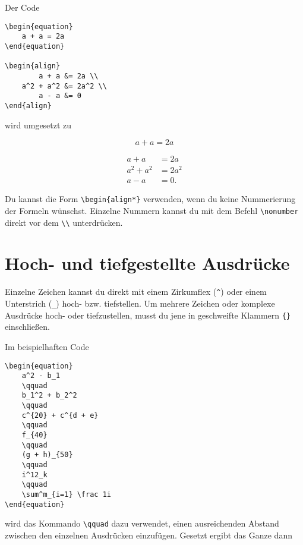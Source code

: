 Der Code

\begin{lstlisting}
\begin{equation}
	a + a = 2a
\end{equation}

\begin{align}
	    a + a &= 2a \\
	a^2 + a^2 &= 2a^2 \\
	    a - a &= 0
\end{align}
\end{lstlisting} 

wird umgesetzt zu

\begin{equation}
	a + a = 2a
\end{equation}

\begin{align}
	    a + a &= 2a \\
	a^2 + a^2 &= 2a^2 \\
	    a - a &= 0.
\end{align}

Du kannst die Form \texttt{\textbackslash begin\{align*\}} verwenden, wenn du keine Nummerierung der Formeln wünschst. Einzelne Nummern kannst du mit dem Befehl \texttt{\textbackslash nonumber} direkt vor dem \texttt{\textbackslash \textbackslash } unterdrücken.

\section{Hoch- und tiefgestellte Ausdrücke}

Einzelne Zeichen kannst du direkt mit einem Zirkumflex (\texttt{\^}) oder einem Unterstrich (\texttt{\_}) hoch- bzw. tiefstellen. Um mehrere Zeichen oder komplexe Ausdrücke hoch- oder tiefzustellen, musst du jene in geschweifte Klammern \texttt{\{\}} %
einschließen.


Im beispielhaften Code
\begin{lstlisting}
\begin{equation}
	a^2 - b_1
	\qquad
	b_1^2 + b_2^2 
	\qquad
	c^{20} + c^{d + e} 
	\qquad
	f_{40}
	\qquad
	(g + h)_{50}
	\qquad
	i^12_k
	\qquad
	\sum^m_{i=1} \frac 1i
\end{equation}
\end{lstlisting} 
wird das Kommando \texttt{\textbackslash qquad} dazu verwendet, einen ausreichenden Abstand zwischen den einzelnen Ausdrücken einzufügen. Gesetzt ergibt das Ganze dann


